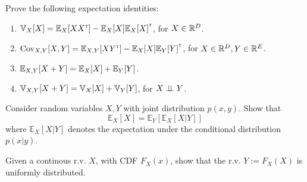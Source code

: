 \begin{question}
Prove the following expectation identities:
\begin{enumerate}[label=\alph*.]
\item $\Var{X}{X} = \Exp{X}{XX\transpose} - \Exp{X}{X}\Exp{X}{X}\transpose$, for $X \in \mathbb{R}^D$.
\item $\Cov_{X,Y}[X,Y] = \Exp{X,Y}{XY\transpose} - \Exp{X}{X}\Exp{Y}{Y}\transpose$, for $X \in \mathbb{R}^D, Y\in\mathbb{R}^E$.
\item $\Exp{X,Y}{X + Y} = \Exp{X}{X} + \Exp{Y}{Y}$.
\item $\Var{X,Y}{X + Y} = \Var{X}{X} + \Var{Y}{Y}$, for $X \perp\!\!\!\perp Y$.
\end{enumerate}
\end{question}



\begin{question}
\label{q:mml-6.11}

Consider random variables $X,Y$ with joint distribution $p(x,y)$. Show that
\begin{equation}
\mathbb{E}_X[X]= \mathbb{E}_Y[\mathbb{E}_X [X|Y]]
\end{equation}
where $\mathbb{E}_X [X|Y]$ denotes the expectation under the conditional distribution $p(x|y)$.
\end{question}

\begin{question}
\label{q:mml-6.13}

Given a continous r.v. $X$, with CDF $F_X(x)$, show that the r.v. $Y:=F_X(X)$ is uniformly distributed.

\end{question}


%
%
